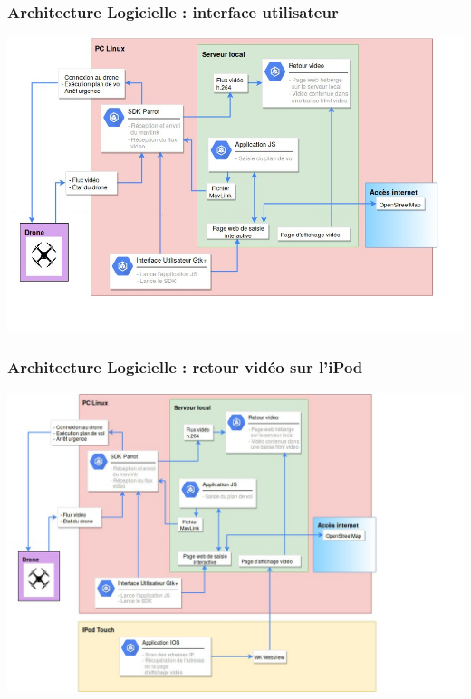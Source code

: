 \documentclass{beamer}
\begin{document}
	\begin{frame}
		
		\begin{center}
		\frametitle{Architecture Logicielle : interface utilisateur}
       
        \includegraphics[scale=0.5]{Architecture_logicielle_drone+interface.jpg}
		\end{center}
	\end{frame}
	

	\begin{frame}
		\begin{center}
		\frametitle{Architecture Logicielle : retour vidéo sur l'iPod}
       
        \includegraphics[scale=0.5]{Architecture_logicielle_drone+interface+iPod.jpg}
		\end{center}
	\end{frame}
\end{document}
